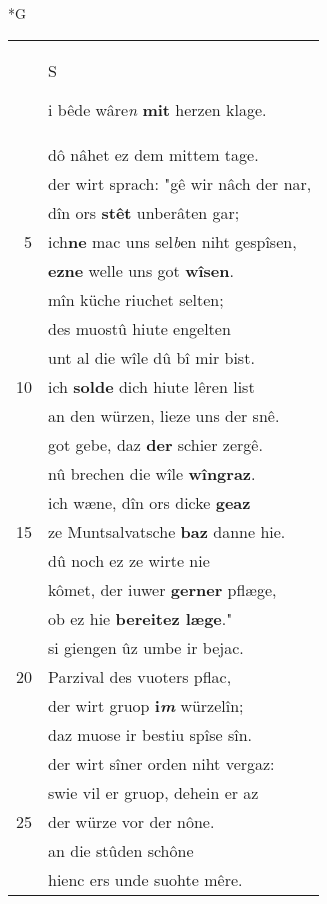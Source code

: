 \documentclass[8pt,a4paper,notitlepage]{article}
\begin{document}
\begin{table}[ht]
\begin{minipage}[t]{0.5\linewidth}
\small
\begin{center}*G
\end{center}
\begin{tabular}{rl}
 & \begin{large}S\end{large}i bêde wâre\textit{n} \textbf{mit} herzen klage.\\ 
 & dô nâhet ez dem mittem tage.\\ 
 & der wirt sprach: "gê wir nâch der nar,\\ 
 & dîn ors \textbf{stêt} unberâten gar;\\ 
5 & ich\textbf{ne} mac uns sel\textit{b}en niht gespîsen,\\ 
 & \textbf{ez}\textbf{ne} welle uns got \textbf{wîsen}.\\ 
 & mîn küche riuchet selten;\\ 
 & des muostû hiute engelten\\ 
 & unt al die wîle dû bî mir bist.\\ 
10 & ich \textbf{solde} dich hiute lêren list\\ 
 & an den würzen, lieze uns der snê.\\ 
 & got gebe, daz \textbf{der} schier zergê.\\ 
 & nû brechen die wîle \textbf{wîngraz}.\\ 
 & ich wæne, dîn ors dicke \textbf{geaz}\\ 
15 & ze Muntsalvatsche \textbf{baz} danne hie.\\ 
 & dû noch ez ze wirte nie\\ 
 & kômet, der iuwer \textbf{gerner} pflæge,\\ 
 & ob ez hie \textbf{bereitez læge}."\\ 
 & si giengen ûz umbe ir bejac.\\ 
20 & Parzival des vuoters pflac,\\ 
 & der wirt gruop \textbf{i\textit{m}} würzelîn;\\ 
 & daz muose ir bestiu spîse sîn.\\ 
 & der wirt sîner orden niht vergaz:\\ 
 & swie vil er gruop, dehein er az\\ 
25 & der würze vor der nône.\\ 
 & an die stûden schône\\ 
 & hienc ers unde suohte mêre.\\ 

\end{tabular}
\end{minipage}
\end{table}
\end{document}
